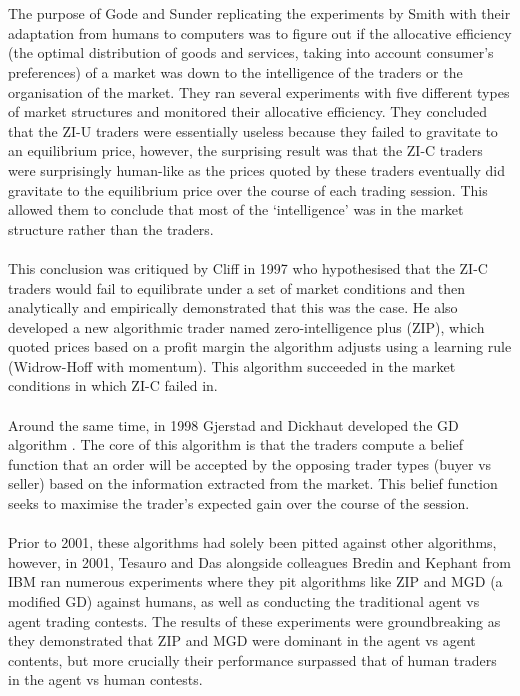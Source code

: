 \documentclass[ %
                    author={Ashwinder Khurana},
                supervisor={Prof Dave Cliff},
                    degree={MEng},
                     title={The Deeply Reinforced Trader},
                  subtitle={},
                      type={enterprise},
                      year={2020} ]{dissertation}
\begin{document}
\\
\\
The purpose of Gode and Sunder replicating the experiments by Smith with their adaptation from humans to computers was to figure out if the allocative efficiency (the optimal distribution of goods and services, taking into account consumer's preferences) of a market was down to the intelligence of the traders or the organisation of the market. They ran several experiments with five different types of market structures and monitored their allocative efficiency. They concluded that the ZI-U traders were essentially useless because they failed to gravitate to an equilibrium price, however, the surprising result was that the ZI-C traders were surprisingly human-like as the prices quoted by these traders eventually did gravitate to the equilibrium price over the course of each trading session. This allowed them to conclude that most of the \enquote*{intelligence} was in the market structure rather than the traders. 
\\
\\
This conclusion was critiqued by Cliff in 1997 \cite{cliff-critique} who hypothesised that the ZI-C traders would fail to equilibrate under a set of market conditions and then analytically and empirically demonstrated that this was the case. He also developed a new algorithmic trader named zero-intelligence plus (ZIP), which quoted prices based on a profit margin the algorithm adjusts using a learning rule (Widrow-Hoff with momentum). This algorithm succeeded in the market conditions in which ZI-C failed in. 
\\
\\
Around the same time, in 1998 Gjerstad and Dickhaut developed the GD algorithm \cite{MGD}. The core of this algorithm is that the traders compute a belief function that an order will be accepted by the opposing trader types (buyer vs seller) based on the information extracted from the market. This belief function seeks to maximise the trader's expected gain over the course of the session.
\\
\\
Prior to 2001, these algorithms had solely been pitted against other algorithms, however, in 2001, Tesauro and Das alongside colleagues Bredin and Kephant from IBM \cite{IBM-experiments} ran numerous experiments where they pit algorithms like ZIP and MGD (a modified GD) against humans, as well as conducting the traditional agent vs agent trading contests. The results of these experiments were groundbreaking as they demonstrated that ZIP and MGD were dominant in the agent vs agent contents, but more crucially their performance surpassed that of human traders in the agent vs human contests. 
\end{document}
